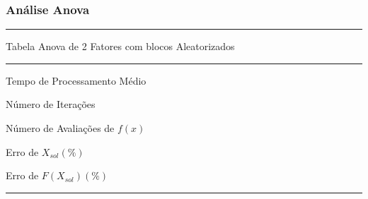 \subsubsection{Análise Anova}

    \begin{minipage}[h!]{\linewidth}
        \centering
        \hrule
        \vspace{2mm}
        {Tabela Anova de 2 Fatores com blocos Aleatorizados}
        \vspace{2mm}
        \noindent
        \hrule 
        \vspace{2mm}
        Tempo de Processamento Médio\\
        \label{tab:tblDa} 
        \writeanova{\tblanovaT}\par
        \bigskip
        \centering
        Número de Iterações\\
        \label{tab:tblDb} 
        \writeanova{\tblanovaNI}\par
        \bigskip
        \centering
        Número de Avaliações de $f(x)$\\
        \label{tab:tblDc} 
        \writeanova{\tblanovaNE}\par
        \bigskip
        \centering
        {Erro de $X_{sol}(\%)$}\\
        \label{tab:tblDb} 
        \writeanova{\tblanovaEX}\par
        \bigskip
        \centering
        {Erro de $F(X_{sol})(\%)$}\\
        \label{tab:tblDb} 
        \writeanova{\tblanovaEF}\par
        \vspace{2mm}
        \hrule
        \vspace{2mm}
    \end{minipage}

